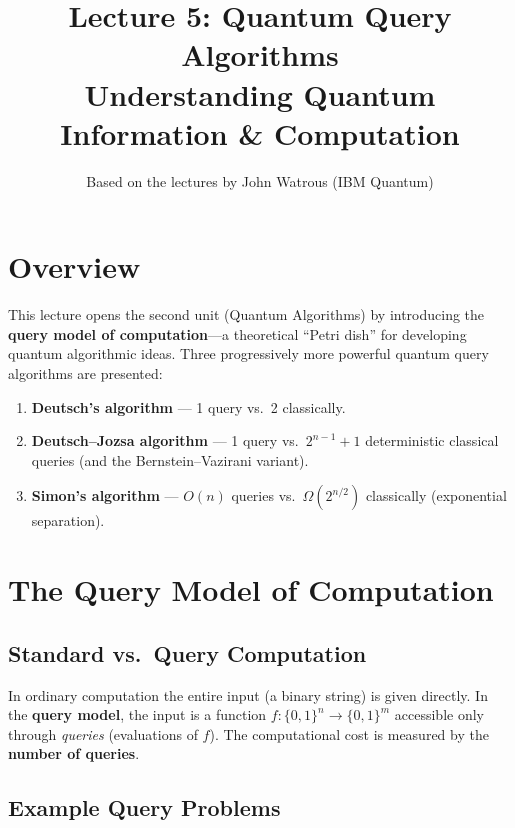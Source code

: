 \documentclass[11pt]{article}
\title{\textbf{Lecture 5: Quantum Query Algorithms} \\ \large Understanding Quantum Information \& Computation}
\author{Based on the lectures by John Watrous (IBM Quantum)}
\date{}
\theoremstyle{definition}
\begin{document}
\maketitle
\tableofcontents
\newpage

\section{Overview}

This lecture opens the second unit (Quantum Algorithms) by introducing the \textbf{query model of computation}---a theoretical ``Petri dish'' for developing quantum algorithmic ideas.  Three progressively more powerful quantum query algorithms are presented:

\begin{enumerate}
    \item \textbf{Deutsch's algorithm} --- 1 query vs.\ 2 classically.
    \item \textbf{Deutsch--Jozsa algorithm} --- 1 query vs.\ $2^{n-1}+1$ deterministic classical queries (and the Bernstein--Vazirani variant).
    \item \textbf{Simon's algorithm} --- $O(n)$ queries vs.\ $\Omega(2^{n/2})$ classically (exponential separation).
\end{enumerate}

\section{The Query Model of Computation}

\subsection{Standard vs.\ Query Computation}

In ordinary computation the entire input (a binary string) is given directly.  In the \textbf{query model}, the input is a function $f:\{0,1\}^n\to\{0,1\}^m$ accessible only through \emph{queries} (evaluations of $f$).  The computational cost is measured by the \textbf{number of queries}.

\subsection{Example Query Problems}
\end{document}
